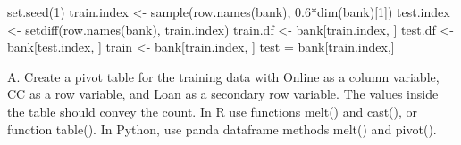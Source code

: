 \documentclass[
]{article}
\newenvironment{Shaded}{\begin{snugshade}}{\end{snugshade}}
\newcommand{\DecValTok}[1]{\textcolor[rgb]{0.00,0.00,0.81}{#1}}
\newcommand{\FloatTok}[1]{\textcolor[rgb]{0.00,0.00,0.81}{#1}}
\newcommand{\FunctionTok}[1]{\textcolor[rgb]{0.00,0.00,0.00}{#1}}
\newcommand{\NormalTok}[1]{#1}
\newcommand{\OtherTok}[1]{\textcolor[rgb]{0.56,0.35,0.01}{#1}}
\newcommand{\SpecialCharTok}[1]{\textcolor[rgb]{0.00,0.00,0.00}{#1}}
\newcommand{\StringTok}[1]{\textcolor[rgb]{0.31,0.60,0.02}{#1}}
\begin{document}
\begin{Shaded}
\end{Shaded}

\begin{Shaded}
\begin{Highlighting}[]
\FunctionTok{set.seed}\NormalTok{(}\DecValTok{1}\NormalTok{)}
\NormalTok{train.index }\OtherTok{\textless{}{-}} \FunctionTok{sample}\NormalTok{(}\FunctionTok{row.names}\NormalTok{(bank), }\FloatTok{0.6}\SpecialCharTok{*}\FunctionTok{dim}\NormalTok{(bank)[}\DecValTok{1}\NormalTok{])  }
\NormalTok{test.index }\OtherTok{\textless{}{-}} \FunctionTok{setdiff}\NormalTok{(}\FunctionTok{row.names}\NormalTok{(bank), train.index) }
\NormalTok{train.df }\OtherTok{\textless{}{-}}\NormalTok{ bank[train.index, ]}
\NormalTok{test.df }\OtherTok{\textless{}{-}}\NormalTok{ bank[test.index, ]}
\NormalTok{train }\OtherTok{\textless{}{-}}\NormalTok{ bank[train.index, ]}
\NormalTok{test }\OtherTok{=}\NormalTok{ bank[train.index,]}
\end{Highlighting}
\end{Shaded}

A. Create a pivot table for the training data with Online as a column
variable, CC as a row variable, and Loan as a secondary row variable.
The values inside the table should convey the count. In R use functions
melt() and cast(), or function table(). In Python, use panda dataframe
methods melt() and pivot().

\begin{Shaded}
\end{Shaded}
\end{document}
